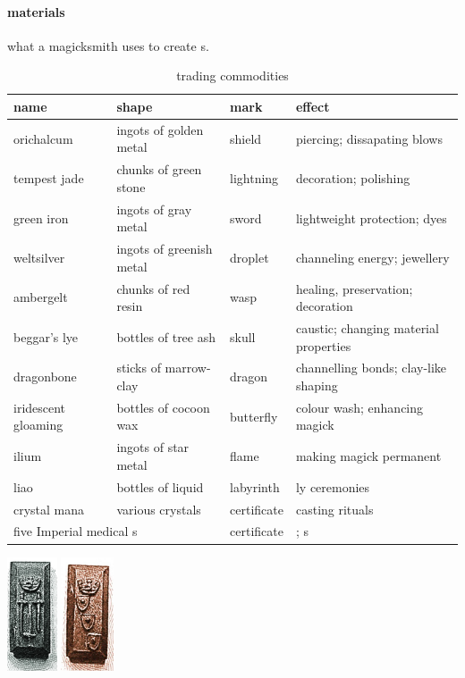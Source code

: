 \paragraph{materials} what a magicksmith uses to create s. \begin{table}\begin{tabular}{p{}p{}p{}p{}}name& shape&mark&effect\\\hline orichalcum&ingots of golden metal & shield& piercing; dissapating blows \\ tempest jade & chunks of green stone & lightning & decoration; polishing \\ green iron & ingots of gray metal & sword & lightweight protection; dyes \\ weltsilver & ingots of greenish metal & droplet & channeling energy; jewellery \\ ambergelt & chunks of red resin & wasp & healing, preservation; decoration \\ beggar's lye & bottles of tree ash & skull & caustic; changing material properties \\ dragonbone & sticks of marrow-clay & dragon & channelling bonds; clay-like shaping \\ iridescent gloaming & bottles of cocoon wax & butterfly & colour wash; enhancing magick \\ ilium & ingots of star metal & flame & making magick permanent \\ liao & bottles of liquid & labyrinth & \s{priest}ly ceremonies \\ crystal mana & various crystals & certificate & casting rituals \\ \multicolumn{2}{l}{five Imperial medical \s{herb}s} & certificate & \s{medicine}; \s{potion}s \end{tabular}\caption{trading commodities}\end{table} \begin{center}\includegraphics[height=3.36cm]{encyclopedia/GreenIron} \quad \includegraphics[height=3.36cm]{encyclopedia/Orichalcum}\end{center}

